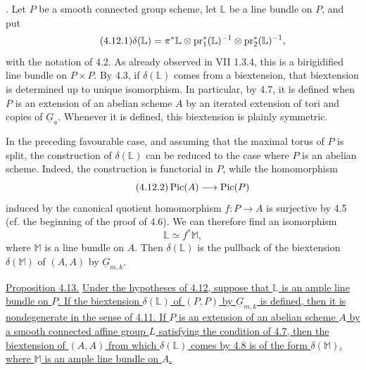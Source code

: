 
\medskip
{}.  Let $P$ be a smooth connected group scheme, let
$\mathbb L$ be a line bundle on $P$, and put
\begin{equation}\tag{4.12.1}
 \delta(\mathbb L)=
 \pi^*\mathbb L\otimes
 \operatorname{pr}_1^*(\mathbb L)^{-1}\otimes
 \operatorname{pr}_2^*(\mathbb L)^{-1},
\end{equation}
with the notation of 4.2.  As already observed in VII 1.3.4, this is
a birigidified line bundle on $P\times P$.  By 4.3, if
$\delta(\mathbb L)$ comes from a biextension, that biextension is
determined up to unique isomorphism.  In particular, by 4.7, it is
defined when $P$ is an extension of an abelian scheme $A$ by an
iterated extension of tori and copies of $\underline G_a$.  Whenever
it is defined, this biextension is plainly symmetric.

In the preceding favourable case, and assuming that the maximal
torus of $P$ is split, the construction of $\delta(\mathbb L)$ can
be reduced to the case where $P$ is an abelian scheme.  Indeed, the
construction is functorial in $P$, while the homomorphism
\begin{equation}\tag{4.12.2}
 \operatorname{Pic}(A)\longrightarrow\operatorname{Pic}(P)
\end{equation}
induced by the canonical quotient homomorphism
$f:P\longrightarrow A$ is surjective by 4.5 (cf. the beginning of
the proof of 4.6).  We can therefore find an isomorphism
\[
 \mathbb L\simeq f^*\mathbb M,
\]
where $\mathbb M$ is a line bundle on $A$.  Then
$\delta(\mathbb L)$ is the pullback of the biextension
$\delta(\mathbb M)$ of $(A,A)$ by $\underline G_{m,k}$.

\medskip
\noindent\underline{Proposition 4.13.}  \underline{Under the
hypotheses of 4.12, suppose that $\mathbb L$ is an ample line bundle
on $P$.  If the biextension $\delta(\mathbb L)$ of $(P,P)$ by
$\underline G_{m,k}$ is defined, then it is nondegenerate in the
sense of 4.11.  If $P$ is an extension of an abelian scheme $A$ by a
smooth connected affine group $L$ satisfying the condition of 4.7,
then the biextension of $(A,A)$ from which $\delta(\mathbb L)$ comes
by 4.8 is of the form $\delta(\mathbb M)$, where $\mathbb M$ is an
ample line bundle on $A$.}

